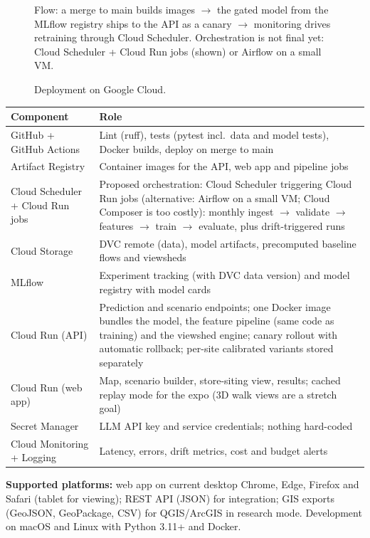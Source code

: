 \documentclass[11pt]{article}
\newcommand{\hrow}{\rowcolor{headgray}}
\begin{document}
\begin{figure}[H]
\vspace{2pt}
{\scriptsize\color{gray} Flow: a merge to main builds images $\rightarrow$ the gated model from the MLflow registry ships to the API as a canary $\rightarrow$ monitoring drives retraining through Cloud Scheduler. Orchestration is not final yet: Cloud Scheduler + Cloud Run jobs (shown) or Airflow on a small VM.}
\caption{Deployment on Google Cloud.}
\end{figure}

\begin{xltabular}{\linewidth}{|L{3.8cm}|Y|}
\hline\hrow
\textbf{Component} & \textbf{Role} \\\hline
\endhead
GitHub + GitHub Actions & Lint (ruff), tests (pytest incl.\ data and model tests), Docker builds, deploy on merge to main \\\hline
Artifact Registry & Container images for the API, web app and pipeline jobs \\\hline
Cloud Scheduler + Cloud Run jobs & Proposed orchestration: Cloud Scheduler triggering Cloud Run jobs (alternative: Airflow on a small VM; Cloud Composer is too costly): monthly ingest $\rightarrow$ validate $\rightarrow$ features $\rightarrow$ train $\rightarrow$ evaluate, plus drift-triggered runs \\\hline
Cloud Storage & DVC remote (data), model artifacts, precomputed baseline flows and viewsheds \\\hline
MLflow & Experiment tracking (with DVC data version) and model registry with model cards \\\hline
Cloud Run (API) & Prediction and scenario endpoints; one Docker image bundles the model, the feature pipeline (same code as training) and the viewshed engine; canary rollout with automatic rollback; per-site calibrated variants stored separately \\\hline
Cloud Run (web app) & Map, scenario builder, store-siting view, results; cached replay mode for the expo (3D walk views are a stretch goal) \\\hline
Secret Manager & LLM API key and service credentials; nothing hard-coded \\\hline
Cloud Monitoring + Logging & Latency, errors, drift metrics, cost and budget alerts \\\hline
\end{xltabular}

\textbf{Supported platforms:} web app on current desktop Chrome, Edge, Firefox and Safari (tablet for viewing); REST API (JSON) for integration; GIS exports (GeoJSON, GeoPackage, CSV) for QGIS/ArcGIS in research mode. Development on macOS and Linux with Python 3.11+ and Docker.
\end{document}
